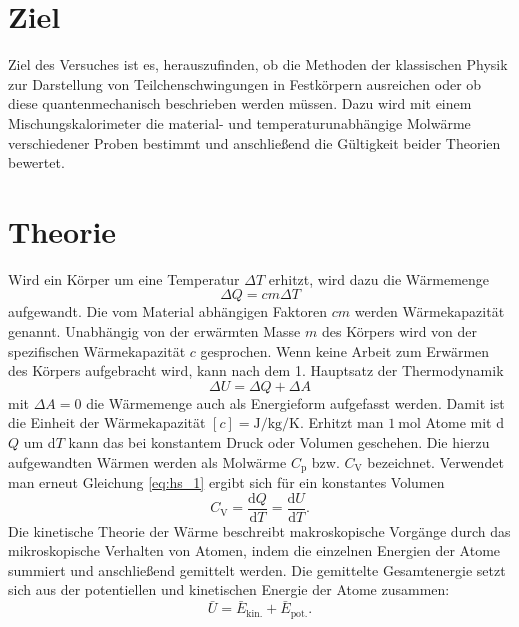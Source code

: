 \section{Ziel}

Ziel des Versuches ist es, herauszufinden, ob die Methoden der klassischen Physik zur Darstellung von Teilchenschwingungen in Festkörpern ausreichen oder ob diese quantenmechanisch beschrieben werden müssen. Dazu wird mit einem Mischungskalorimeter die material- und temperaturunabhängige Molwärme verschiedener Proben bestimmt und anschließend die Gültigkeit beider Theorien bewertet.
\section{Theorie}
\label{sec:Theorie}

Wird ein Körper  um eine Temperatur $\Delta{T}$ erhitzt, wird dazu die Wärmemenge 
\begin{equation}
\Delta{Q}=c m \Delta{T}
\label{eq:waermekapazitaet}
\end{equation}
aufgewandt. Die vom Material abhängigen Faktoren $c m$ werden Wärmekapazität genannt. 
Unabhängig von der erwärmten Masse $m$ des Körpers wird von der spezifischen Wärmekapazität $c$ gesprochen.
Wenn keine Arbeit zum Erwärmen des Körpers aufgebracht wird, kann nach dem 1. Hauptsatz der Thermodynamik
\begin{equation}
	\Delta{U}=\Delta{Q}+\Delta{A}
	\label{eq:hs_1}
\end{equation}
mit $\Delta{A}=0$ die Wärmemenge auch als Energieform aufgefasst werden. 
Damit ist die Einheit der Wärmekapazität $[c]=\si{\joule\per\kilo\gram\per\kelvin}$.
Erhitzt man $\SI{1}{\mol}$ Atome mit d$Q$ um d$T$ kann das bei konstantem Druck oder Volumen geschehen.
Die hierzu aufgewandten Wärmen werden als Molwärme $C_\mathup{p}$ bzw. $C_\mathup{V}$ bezeichnet. 
Verwendet man erneut Gleichung \eqref{eq:hs_1} 
ergibt sich für ein konstantes Volumen 
\begin{equation}
	C_\mathup{V}=\frac{\mathup{d}{Q}}{\mathup{d}{T}}=\frac{\mathup{d}{U}}{\mathup{d}{T}}.
	\label{eq:molwaerme}
\end{equation}
Die kinetische Theorie der Wärme beschreibt makroskopische Vorgänge durch das mikroskopische Verhalten von Atomen, indem die einzelnen Energien der Atome summiert und anschließend gemittelt werden. 
Die gemittelte Gesamtenergie setzt sich aus der potentiellen und kinetischen Energie der Atome zusammen:
\begin{equation}
	\bar{U}=\bar{E}_\mathup{kin.}+\bar{E}_\mathup{pot.}.
	\label{eq:innere_Energie}
\end{equation}
